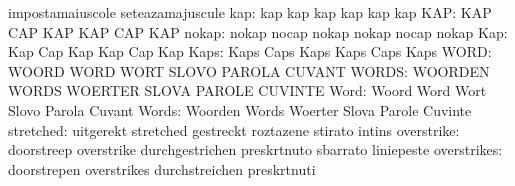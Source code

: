                                   impostamaiuscole                 seteazamajuscule
                             kap: kap                              kap
                                  kap                              kap
                                  kap                              kap
                             KAP: KAP                              CAP
                                  KAP                              KAP
                                  CAP                              KAP
                           nokap: nokap                            nocap
                                  nokap                            nokap
                                  nocap                            nokap
                             Kap: Kap                              Cap
                                  Kap                              Kap
                                  Cap                              Kap
                            Kaps: Kaps                             Caps
                                  Kaps                             Kaps
                                  Caps                             Kaps
                            WORD: WOORD                            WORD
                                  WORT                             SLOVO
                                  PAROLA                           CUVANT
                           WORDS: WOORDEN                          WORDS
                                  WOERTER                          SLOVA
                                  PAROLE                           CUVINTE
                            Word: Woord                            Word
                                  Wort                             Slovo
                                  Parola                           Cuvant
                           Words: Woorden                          Words
                                  Woerter                          Slova
                                  Parole                           Cuvinte
                       stretched: uitgerekt                        stretched
                                  gestreckt                        roztazene
                                  stirato                          intins
                      overstrike: doorstreep                       overstrike
                                  durchgestrichen                  preskrtnuto
                                  sbarrato                         liniepeste
                     overstrikes: doorstrepen                      overstrikes
                                  durchstreichen                   preskrtnuti
